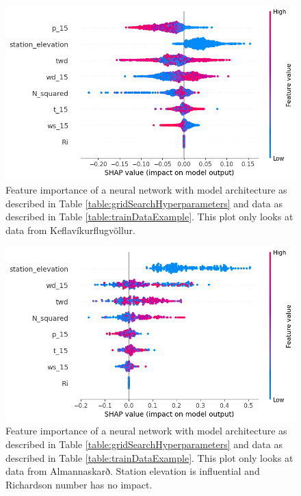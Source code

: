 \begin{figure}
    \centering
    \includegraphics[scale = 0.6]{Figures/shap_plots/summary_plot_1350.png}
    \caption[Shapley Summary plot at Keflavíkurflugvöllur.]{Feature importance of a neural network with model architecture as described in Table \ref{table:gridSearchHyperparameters} and data as described in Table \ref{table:trainDataExample}. This plot only looks at data from Keflavíkurflugvöllur.}
    \label{fig:ShapleySummaryKeflavikurflugvollur}
\end{figure}

\begin{figure}
    \centering
    \includegraphics[scale = 0.6]{Figures/shap_plots/summary_plot_35553.png}
    \caption[Shapley Summary plot at Almannaskarð.]{Feature importance of a neural network with model architecture as described in Table \ref{table:gridSearchHyperparameters} and data as described in Table \ref{table:trainDataExample}. This plot only looks at data from Almannaskarð. Station elevation is influential and Richardson number has no impact.}
    \label{fig:ShapleySummaryAlmannaskarð}
\end{figure}

